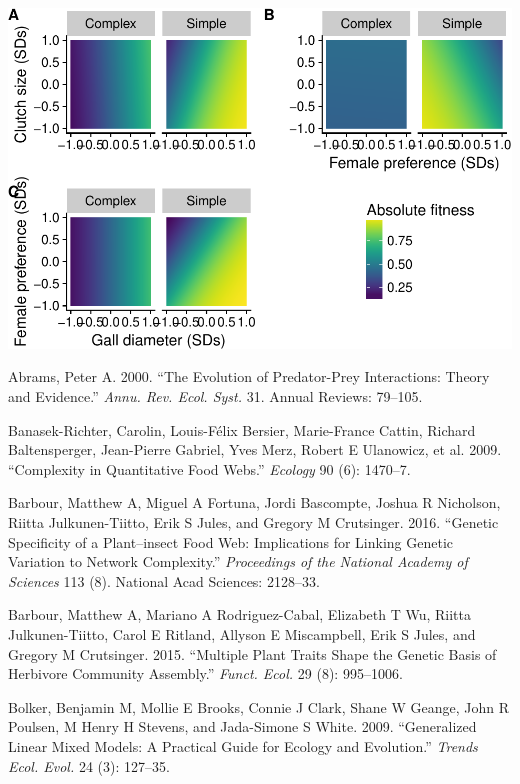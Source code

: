 \documentclass[]{elsarticle} %
\makeatletter
\def\maxwidth{\ifdim\Gin@nat@width>\linewidth\linewidth
\else\Gin@nat@width\fi}
\let\Oldincludegraphics\includegraphics
\renewcommand{\includegraphics}[1]{\Oldincludegraphics[width=\maxwidth]{#1}}
\makeatother
\begin{document}
\includegraphics{elsevier_test_files/figure-latex/Multivariate Absolute Fitness Landscapes-1.pdf}

\hypertarget{refs}{}
\hypertarget{ref-Abrams2000}{}
Abrams, Peter A. 2000. ``The Evolution of Predator-Prey Interactions:
Theory and Evidence.'' \emph{Annu. Rev. Ecol. Syst.} 31. Annual Reviews:
79--105.

\hypertarget{ref-Banasek-Richter2009}{}
Banasek-Richter, Carolin, Louis-Félix Bersier, Marie-France Cattin,
Richard Baltensperger, Jean-Pierre Gabriel, Yves Merz, Robert E
Ulanowicz, et al. 2009. ``Complexity in Quantitative Food Webs.''
\emph{Ecology} 90 (6): 1470--7.

\hypertarget{ref-Barbour2016}{}
Barbour, Matthew A, Miguel A Fortuna, Jordi Bascompte, Joshua R
Nicholson, Riitta Julkunen-Tiitto, Erik S Jules, and Gregory M
Crutsinger. 2016. ``Genetic Specificity of a Plant--insect Food Web:
Implications for Linking Genetic Variation to Network Complexity.''
\emph{Proceedings of the National Academy of Sciences} 113 (8). National
Acad Sciences: 2128--33.

\hypertarget{ref-Barbour2015}{}
Barbour, Matthew A, Mariano A Rodriguez-Cabal, Elizabeth T Wu, Riitta
Julkunen-Tiitto, Carol E Ritland, Allyson E Miscampbell, Erik S Jules,
and Gregory M Crutsinger. 2015. ``Multiple Plant Traits Shape the
Genetic Basis of Herbivore Community Assembly.'' \emph{Funct. Ecol.} 29
(8): 995--1006.

\hypertarget{ref-Bolker2009}{}
Bolker, Benjamin M, Mollie E Brooks, Connie J Clark, Shane W Geange,
John R Poulsen, M Henry H Stevens, and Jada-Simone S White. 2009.
``Generalized Linear Mixed Models: A Practical Guide for Ecology and
Evolution.'' \emph{Trends Ecol. Evol.} 24 (3): 127--35.
\end{document}
